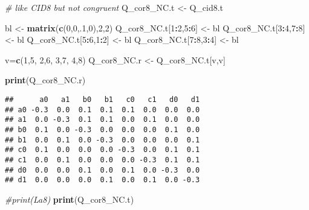 \documentclass[
]{article}
\newenvironment{Shaded}{\begin{snugshade}}{\end{snugshade}}
\newcommand{\CommentTok}[1]{\textcolor[rgb]{0.56,0.35,0.01}{\textit{#1}}}
\newcommand{\DecValTok}[1]{\textcolor[rgb]{0.00,0.00,0.81}{#1}}
\newcommand{\FunctionTok}[1]{\textcolor[rgb]{0.13,0.29,0.53}{\textbf{#1}}}
\newcommand{\NormalTok}[1]{#1}
\newcommand{\OtherTok}[1]{\textcolor[rgb]{0.56,0.35,0.01}{#1}}
\newcommand{\SpecialCharTok}[1]{\textcolor[rgb]{0.81,0.36,0.00}{\textbf{#1}}}
\begin{document}
\begin{Shaded}
\begin{Highlighting}[]
\CommentTok{\# like CID8 but not congruent}
\NormalTok{Q\_cor8\_NC.t }\OtherTok{\textless{}{-}}\NormalTok{ Q\_cid8.t}

\NormalTok{bl }\OtherTok{\textless{}{-}} \FunctionTok{matrix}\NormalTok{(}\FunctionTok{c}\NormalTok{(}\DecValTok{0}\NormalTok{,}\DecValTok{0}\NormalTok{,.}\DecValTok{1}\NormalTok{,}\DecValTok{0}\NormalTok{),}\DecValTok{2}\NormalTok{,}\DecValTok{2}\NormalTok{)}
\NormalTok{Q\_cor8\_NC.t[}\DecValTok{1}\SpecialCharTok{:}\DecValTok{2}\NormalTok{,}\DecValTok{5}\SpecialCharTok{:}\DecValTok{6}\NormalTok{] }\OtherTok{\textless{}{-}}\NormalTok{ bl}
\NormalTok{Q\_cor8\_NC.t[}\DecValTok{3}\SpecialCharTok{:}\DecValTok{4}\NormalTok{,}\DecValTok{7}\SpecialCharTok{:}\DecValTok{8}\NormalTok{] }\OtherTok{\textless{}{-}}\NormalTok{ bl}
\NormalTok{Q\_cor8\_NC.t[}\DecValTok{5}\SpecialCharTok{:}\DecValTok{6}\NormalTok{,}\DecValTok{1}\SpecialCharTok{:}\DecValTok{2}\NormalTok{] }\OtherTok{\textless{}{-}}\NormalTok{ bl}
\NormalTok{Q\_cor8\_NC.t[}\DecValTok{7}\SpecialCharTok{:}\DecValTok{8}\NormalTok{,}\DecValTok{3}\SpecialCharTok{:}\DecValTok{4}\NormalTok{] }\OtherTok{\textless{}{-}}\NormalTok{ bl}

\NormalTok{v}\OtherTok{=}\FunctionTok{c}\NormalTok{(}\DecValTok{1}\NormalTok{,}\DecValTok{5}\NormalTok{, }\DecValTok{2}\NormalTok{,}\DecValTok{6}\NormalTok{, }\DecValTok{3}\NormalTok{,}\DecValTok{7}\NormalTok{, }\DecValTok{4}\NormalTok{,}\DecValTok{8}\NormalTok{)}
\NormalTok{Q\_cor8\_NC.r }\OtherTok{\textless{}{-}}\NormalTok{ Q\_cor8\_NC.t[v,v]}

\FunctionTok{print}\NormalTok{(Q\_cor8\_NC.r)}
\end{Highlighting}
\end{Shaded}

\begin{verbatim}
##      a0   a1   b0   b1   c0   c1   d0   d1
## a0 -0.3  0.0  0.1  0.1  0.1  0.0  0.0  0.0
## a1  0.0 -0.3  0.1  0.1  0.0  0.1  0.0  0.0
## b0  0.1  0.0 -0.3  0.0  0.0  0.0  0.1  0.0
## b1  0.0  0.1  0.0 -0.3  0.0  0.0  0.0  0.1
## c0  0.1  0.0  0.0  0.0 -0.3  0.0  0.1  0.1
## c1  0.0  0.1  0.0  0.0  0.0 -0.3  0.1  0.1
## d0  0.0  0.0  0.1  0.0  0.1  0.0 -0.3  0.0
## d1  0.0  0.0  0.0  0.1  0.0  0.1  0.0 -0.3
\end{verbatim}

\begin{Shaded}
\begin{Highlighting}[]
\CommentTok{\#print(La8)}
\FunctionTok{print}\NormalTok{(Q\_cor8\_NC.t)}
\end{Highlighting}
\end{Shaded}
\end{document}
